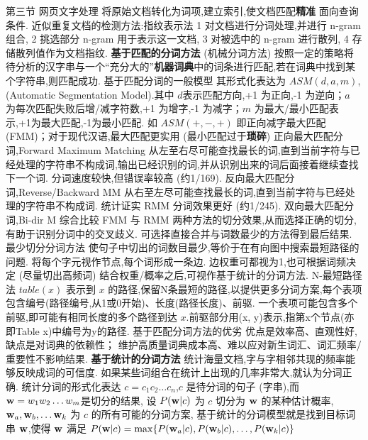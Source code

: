 \documentclass[10pt, utf8]{ctexart}
\begin{document}
\begin{multicols}{4}
    {\color{orange_}第三节 网页文字处理} 将原始文档转化为词项,建立索引,使文档匹配\textbf{精准} 面向查询条件.
    {\color{blue}近似重复文档的检测方法:指纹表示法}
    1 对文档进行分词处理,并进行 n-gram 组合, 2 挑选部分 n-gram 用于表示这一文档, 3 对被选中的 n-gram 进行散列, 4 存储散列值作为文档指纹.
    {\color{purple_}\textbf{基于匹配的分词方法}}
    (机械分词方法) 按照一定的策略将待分析的汉字串与一个“充分大的”\textbf{机器词典}中的词条进行匹配,若在词典中找到某个字符串,则匹配成功.
    {\color{blue}基于匹配分词的一般模型}
    其形式化表达为 $ASM(d,a,m)$, (Automatic Segmentation Model).其中 $d$表示匹配方向,+1 为正向,-1 为逆向；$a$ 为每次匹配失败后增/减字符数,+1 为增字,-1 为减字；$m$ 为最大/最小匹配表示,+1为最大匹配,-1为最小匹配.
    如 $ASM(+,-,+)$ 即正向减字最大匹配 (FMM)；对于现代汉语,最大匹配更实用 (最小匹配过于\textbf{琐碎})
    {\color{blue}正向最大匹配分词,Forward Maximum Matching}
    从左至右尽可能查找最长的词,直到当前字符与已经处理的字符串不构成词,输出已经识别的词,并从识别出来的词后面接着继续查找下一个词.
    分词速度较快,但错误率较高 (约1/169).
        {\color{blue}反向最大匹配分词,Reverse/Backward MM}
    从右至左尽可能查找最长的词,直到当前字符与已经处理的字符串不构成词.
    统计证实 RMM 分词效果更好 (约1/245).
        {\color{blue}双向最大匹配分词,Bi-dir M}
    综合比较 FMM 与 RMM 两种方法的切分效果,从而选择正确的切分,有助于识别分词中的交叉歧义.
    可选择直接合并与词数最少的方法得到最后结果.
    {\color{blue}最少切分分词方法}
    使句子中切出的词数目最少,等价于在有向图中搜索最短路径的问题.
    将每个字元视作节点,每个词形成一条边.
    边权重可都视为1,也可根据词频决定 (尽量切出高频词)
    结合权重/概率之后,可视作基于统计的分词方法.
    {\color{red}N-最短路径法} $table(x)$ 表示到 $x$ 的路径,保留N条最短的路径,以提供更多分词方案,每个表项包含编号(路径编号,从1或0开始)、长度(路径长度)、前驱.
    一个表项可能包含多个前驱,即可能有相同长度的多个路径到达 $x$.前驱部分用(x, y)表示,指第x个节点(亦即Table x)中编号为y的路径.
    {\color{blue}基于匹配分词方法的优劣}
    优点是效率高、直观性好,缺点是对词典的依赖性；
    维护高质量词典成本高、难以应对新生词汇、词汇频率/重要性不影响结果.
    {\color{purple_}\textbf{基于统计的分词方法}}
    统计海量文档,字与字相邻共现的频率能够反映成词的可信度.
    如果某些词组合在统计上出现的几率非常大,就认为分词正确.
    {\color{red}统计分词的形式化表达}
    $c=c_1c_2\ldots c_n$,$c$ 是待分词的句子 (字串),而 ${\bf w}=w_1w_2\ldots w_m$是切分的结果,
    设 $P({\bf w}|c)$ 为 $c$ 切分为 ${\bf w}$ 的某种估计概率,${\bf w}_a,{\bf w}_b,\ldots{\bf w}_k$ 为 $c$ 的所有可能的分词方案,
    基于统计的分词模型就是找到目标词串 $\bf w$,使得 $\bf w$ 满足 $P({\bf w}|c)=\max\{P({\bf w}_a|c),P({\bf w}_b|c),\ldots,P({\bf w}_k|c)\}$

\end{multicols}
\end{document}
